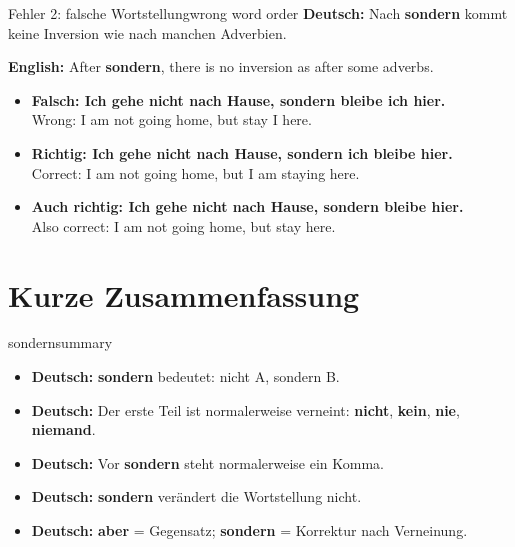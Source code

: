 \documentclass[a4paper,11pt]{article}
\newcommand{\GermanText}[1]{\textbf{Deutsch: }#1\par}
\newcommand{\EnglishText}[1]{{\small\color{SoftGray}\textbf{English: }#1\par}}
\newcommand{\ExampleItem}[2]{\item \textbf{#1}\\{\small\color{SoftGray}#2}}
\begin{document}
\begin{grammarentry}{Fehler 2: falsche Wortstellung}{wrong word order}
\GermanText{Nach \textbf{sondern} kommt keine Inversion wie nach manchen Adverbien.}
\EnglishText{After \textbf{sondern}, there is no inversion as after some adverbs.}

\begin{exbox}
\begin{itemize}
    \ExampleItem{Falsch: Ich gehe nicht nach Hause, sondern bleibe ich hier.}{Wrong: I am not going home, but stay I here.}
    \ExampleItem{Richtig: Ich gehe nicht nach Hause, sondern ich bleibe hier.}{Correct: I am not going home, but I am staying here.}
    \ExampleItem{Auch richtig: Ich gehe nicht nach Hause, sondern bleibe hier.}{Also correct: I am not going home, but stay here.}
\end{itemize}
\end{exbox}
\end{grammarentry}

\section{Kurze Zusammenfassung}

\begin{grammarentry}{sondern}{summary}
\begin{itemize}
    \item \GermanText{\textbf{sondern} bedeutet: nicht A, sondern B.}
    \item \GermanText{Der erste Teil ist normalerweise verneint: \textbf{nicht}, \textbf{kein}, \textbf{nie}, \textbf{niemand}.}
    \item \GermanText{Vor \textbf{sondern} steht normalerweise ein Komma.}
    \item \GermanText{\textbf{sondern} verändert die Wortstellung nicht.}
    \item \GermanText{\textbf{aber} = Gegensatz; \textbf{sondern} = Korrektur nach Verneinung.}
\end{itemize}
\end{grammarentry}
\end{document}
